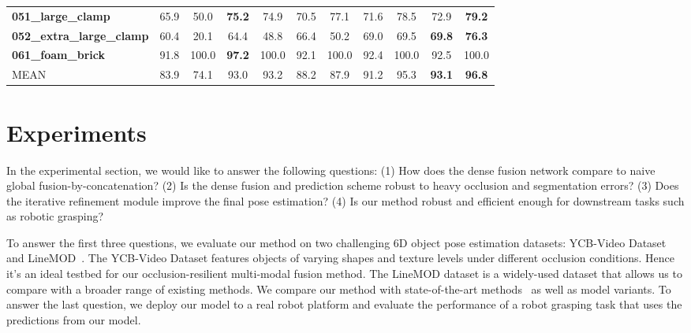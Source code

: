 \documentclass[10pt,twocolumn,letterpaper]{article}
\begin{document}
\begin{table*}
\begin{tabular}{l|c|c|c|c|c|c|c|c|c|c}
\textbf{051\_large\_clamp}        & 65.9      & 50.0                & \textbf{75.2}  & 74.9           & 70.5       & 77.1                 & 71.6         & 78.5                   & 72.9             & \textbf{79.2}     \\
\textbf{052\_extra\_large\_clamp} & 60.4      & 20.1                & 64.4           & 48.8           & 66.4       & 50.2                 & 69.0         & 69.5                   & \textbf{69.8}    & \textbf{76.3}     \\
\textbf{061\_foam\_brick}         & 91.8      & 100.0               & \textbf{97.2}  & 100.0          & 92.1       & 100.0                & 92.4         & 100.0                  & 92.5             & 100.0             \\ \hline
MEAN                      & 83.9      & 74.1                & 93.0           & 93.2           & 88.2       & 87.9                 & 91.2         & 95.3                   & \textbf{93.1}    & \textbf{96.8}  \\ \hline
\end{tabular}
\label{exp:ycb}
\end{table*}


\section{Experiments}
\label{sec:exp}

In the experimental section, we would like to answer the following questions: (1) How does the dense fusion network compare to naive global fusion-by-concatenation? (2) Is the dense fusion and prediction scheme robust to heavy occlusion and segmentation errors? (3) Does the iterative refinement module improve the final pose estimation? (4) Is our method robust and efficient enough for downstream tasks such as robotic grasping?

To answer the first three questions, we evaluate our method on two challenging 6D object pose estimation datasets: YCB-Video Dataset~\cite{xiang2017posecnn} and LineMOD~\cite{Hinterstoier2011MultimodalTF}. The YCB-Video Dataset features objects of varying shapes and texture levels under different occlusion conditions. Hence it's an ideal testbed for our occlusion-resilient multi-modal fusion method. The LineMOD dataset is a widely-used dataset that allows us to compare with a broader range of existing methods. We compare our method with state-of-the-art methods~\cite{sundermeyer2018implicit,kehl2017ssd} as well as model variants. To answer the last question, we deploy our model to a real robot platform and evaluate the performance of a robot grasping task that uses the predictions from our model.
\end{document}
